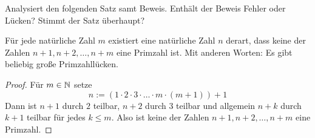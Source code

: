 \begin{aufg}[Fehlersuche II]
    Analysiert den folgenden Satz samt Beweis. Enthält der Beweis Fehler oder Lücken? Stimmt der Satz überhaupt?
    \begin{satz}
        Für jede natürliche Zahl $m$ existiert eine natürliche Zahl $n$ derart, dass keine der Zahlen $n+1,n+2,\dots , n+m$ eine Primzahl ist. Mit anderen Worten: Es gibt beliebig große Primzahllücken.
    \end{satz}
    \begin{proof}
        Für $m\in \mathbb N$ setze
            \[ n:= (1 \cdot 2 \cdot 3 \cdot \ldots \cdot m \cdot(m+1)) +1 \]
        Dann ist $n+1$ durch $2$ teilbar, $n+2$ durch $3$ teilbar und allgemein $n+k$ durch $k+1$ teilbar für jedes $k\le m$. Also ist keine der Zahlen $n+1,n+2,\dots , n+m$ eine Primzahl.
    \end{proof}
\end{aufg}


